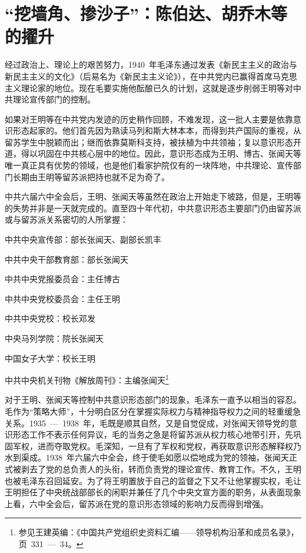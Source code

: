 \section{“挖墙角、掺沙子”：陈伯达、胡乔木等的擢升}

经过政治上、理论上的艰苦努力，1940~年毛泽东通过发表《新民主主义的政治与新民主主义的文化》（后易名为《新民主主义论》），在中共党内已赢得首席马克思主义理论家的地位。现在毛要实施他酝酿已久的计划，这就是逐步削弱王明等对中共理论宣传部门的控制。

如果对王明等在中共党内发迹的历史稍作回顾，不难发现，这一批人主要是依靠意识形态起家的。他们首先因为熟读马列和斯大林本本，而得到共产国际的重视，从留苏学生中脱颖而出；继而依靠莫斯科支持，被扶植为中共领袖；复以意识形态开道，得以巩固在中共核心层中的地位。因此，意识形态成为王明、博古、张闻天等唯一真正具有优势的领域，也是他们看家护院仅有的一块阵地，中共理论、宣传部门长期由王明等留苏派把持也就不足为奇了。

中共六届六中全会后，王明、张闻天等虽然在政治上开始走下坡路，但是，王明等的失势并非是一天就完成的。直至四十年代初，中共意识形态主要部门仍由留苏派或与留苏派关系密切的人所掌握：

中共中央宣传部：部长张闻天、副部长凯丰

中共中央干部教育部：部长张闻天

中共中央党报委员会：主任博古

中共中央党校委员会：主任王明

中共中央党校：校长邓发

中央马列学院：院长张闻天

中国女子大学：校长王明

中共中央机关刊物《解放周刊》：主编张闻天\footnote{参见王建英编：《中国共产党组织史资料汇编——领导机构沿革和成员名录》，页~331~—~34。}

对于王明、张闻天等控制中共意识形态部门的现象，毛泽东一直予以相当的容忍。毛作为“策略大师”，十分明白区分在掌握实际权力与精神指导权力之间的轻重缓急关系。1935~—~1938~年，毛既是顺其自然，又是自觉促成，对张闻天领导党的意识形态工作不表示任何异议，毛的当务之急是将留苏派从权力核心地带引开，先巩固军权，进而夺取党权。毛深知，一旦有了军权和党权，再获取意识形态解释权乃水到渠成。1938~年六届六中全会，终于使毛如愿以偿地成为党的领袖，张闻天正式被剥去了党的总负责人的头衔，转而负责党的理论宣传、教育工作。不久，王明也被毛泽东召回延安。为了将王明置放于自己的监督之下又不让他掌握实权，毛让王明担任了中央统战部部长的闲职并兼任了几个中央文宣方面的职务，从表面现象上看，六中全会后，留苏派在党的意识形态领域的影响力反而得到增强。

